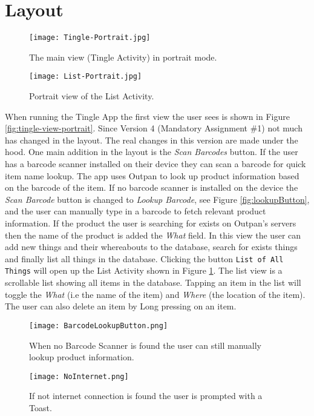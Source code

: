 \section{Layout}

\begin{figure}[!htb]
		\centering
		\texttt{[image: Tingle-Portrait.jpg]}
		\caption{The main view (Tingle Activity) in portrait mode.}
		\label{fig:tingle-view-portrait}
	\endminipage\hfill
		\centering
		\texttt{[image: List-Portrait.jpg]}
		\caption{Portrait view of the List Activity.}
		\label{fig:list-view-portrait}
	\endminipage\hfill
\end{figure}

When running the Tingle App the first view the user sees is shown in Figure \ref{fig:tingle-view-portrait}. Since Version 4 (Mandatory Assignment \#1) not much has changed in the layout. The real changes in this version are made under the hood. One main addition in the layout is the \emph{Scan Barcodes} button. If the user has a barcode scanner installed on their device they can scan a barcode for quick item name lookup. The app uses Outpan to look up product information based on the barcode of the item. If no barcode scanner is installed on the device the \emph{Scan Barcode} button is changed to \emph{Lookup Barcode}, see Figure \ref{fig:lookupButton}, and the user can manually type in a barcode to fetch relevant product information. If the product the user is searching for exists on Outpan's servers then the name of the
product is added the \emph{What} field.
In this view the user can add new things and their whereabouts to the database, search for exists things and finally list all things in the database. Clicking the button \texttt{List of All Things} will open up the List Activity shown in Figure \ref{fig:list-view-portrait}. The list view is a scrollable list showing all items in the database. Tapping an item in the list will toggle the \emph{What} (i.e the name of the item) and \emph{Where} (the location of the item). The user can also delete an item by Long pressing on an item.

\begin{figure}[!htb]
	\centering
	\texttt{[image: BarcodeLookupButton.png]}
	\caption{When no Barcode Scanner is found the user can still manually lookup product information.}
	\label{fig:lookupButton}
	\endminipage\hfill
	\centering
	\texttt{[image: NoInternet.png]}
	\caption{If not internet connection is found the user is prompted with a Toast.}
	\label{fig:noInternet}
	\endminipage\hfill
\end{figure}

